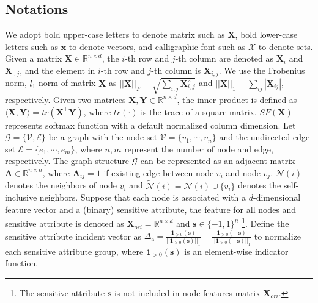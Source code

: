 \documentclass[letterpaper]{article} %
\theoremstyle{plain}
\theoremstyle{definition}
\theoremstyle{remark}
\begin{document}
\subsection{Notations}
We adopt bold upper-case letters to denote matrix such as $\mathbf{X}$, bold lower-case letters such as $\mathbf{x}$ to denote vectors, and calligraphic font such as $\mathcal{X}$ to denote sets. Given a matrix $\mathbf{X}\in\mathbb{R}^{n\times d}$, the $i$-th row and $j$-th column are denoted as $\mathbf{X}_i$ and $\mathbf{X}_{\cdot,j}$, and the element in $i$-th row and $j$-th column is
$\mathbf{X}_{i,j}$. We use the Frobenius norm, $l_1$ norm of matrix $\mathbf{X}$ as $||\mathbf{X}||_F=\sqrt{\sum_{i,j}\mathbf{X}_{i,j}^2}$ and $||\mathbf{X}||_1=\sum_{ij}|\mathbf{X}_{ij}|$, respectively. Given two matrices $\mathbf{X}, \mathbf{Y}\in\mathbb{R}^{n \times d}$, the inner product is defined as $\langle\mathbf{X}, \mathbf{Y}\rangle=tr(\mathbf{X}^{\top}\mathbf{Y})$, where $tr(\cdot)$ is the trace of a square matrix. $SF(\mathbf{X})$ represents softmax function with a default normalized column dimension. Let $\mathcal{G}=\{\mathcal{V}, \mathcal{E}\}$ be a graph with the node set $\mathcal{V}=\{v_1, \cdots, v_n\}$ and the undirected edge set $\mathcal{E}=\{e_1, \cdots, e_m\}$, where $n, m$ represent the number of node and edge, respectively. The graph structure $\mathcal{G}$ can be represented as an adjacent matrix $\mathbf{A}\in\mathbb{R}^{n\times n}$, where $\mathbf{A}_{ij}=1$ if existing edge between node $v_i$ and node $v_j$. $\mathcal{N}(i)$ denotes the neighbors
of node $v_i$ and $\tilde{\mathcal{N}}(i)=\mathcal{N}(i)\cup \{v_i\}$ denotes the self-inclusive neighbors.
Suppose that each node is associated with a $d$-dimensional feature vector and a (binary) sensitive attribute, the feature for all nodes and sensitive attribute is denoted as $\mathbf{X}_{ori}=\mathbb{R}^{n\times d}$ and $\mathbf{s}\in \{-1, 1\}^{n}$ \footnote{The sensitive attribute $\mathbf{s}$ is not included in node features matrix $\mathbf{X}_{ori}$.}. Define the sensitive attribute incident vector as $\Delta_{\mathbf{s}}= \frac{\bm{1}_{>0}(\mathbf{s})}{||\bm{1}_{>0}(\mathbf{s})||_1} - \frac{\bm{1}_{>0}(-\mathbf{s})}{||\bm{1}_{>0}(-\mathbf{s})||_1}$ to normalize each sensitive attribute group, where $\bm{1}_{>0}(\mathbf{s})$ is an element-wise indicator function.
\end{document}

